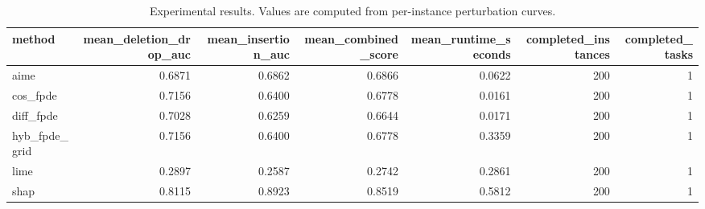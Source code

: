 \begin{table}[t]
\caption{Experimental results. Values are computed from per-instance perturbation curves.}
\label{tab:main_results_computed}
\centering
\begin{tabular}{lrrrrrr}
\toprule
method & mean\_deletion\_drop\_auc & mean\_insertion\_auc & mean\_combined\_score & mean\_runtime\_seconds & completed\_instances & completed\_tasks \\
\midrule
aime & 0.6871 & 0.6862 & 0.6866 & 0.0622 & 200 & 1 \\
cos\_fpde & 0.7156 & 0.6400 & 0.6778 & 0.0161 & 200 & 1 \\
diff\_fpde & 0.7028 & 0.6259 & 0.6644 & 0.0171 & 200 & 1 \\
hyb\_fpde\_grid & 0.7156 & 0.6400 & 0.6778 & 0.3359 & 200 & 1 \\
lime & 0.2897 & 0.2587 & 0.2742 & 0.2861 & 200 & 1 \\
shap & 0.8115 & 0.8923 & 0.8519 & 0.5812 & 200 & 1 \\
\bottomrule
\end{tabular}

\end{table}
